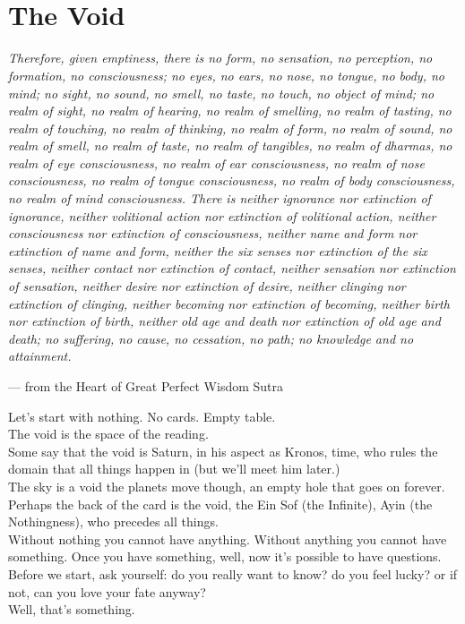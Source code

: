 \documentclass[openright]{book}
\newcommand{\numchapter}[2]{%
  \newpage
  \section*{{\fontsize{14}{17}\selectfont #1}\\[2mm] #2}%
  \addcontentsline{toc}{section}{#1\hspace{1.5mm}#2}%
}
\begin{document}
\pagestyle{content}
\setcounter{page}{1}

\tableofcontents

\numchapter{0}{The Void}

{\fontsize{11}{13}\selectfont\itshape
Therefore, given emptiness, there is no form, no sensation, no perception, no formation, no consciousness; no eyes, no ears, no nose, no tongue, no body, no mind; no sight, no sound, no smell, no taste, no touch, no object of mind; no realm of sight, no realm of hearing, no realm of smelling, no realm of tasting, no realm of touching, no realm of thinking, no realm of form, no realm of sound, no realm of smell, no realm of taste, no realm of tangibles, no realm of dharmas, no realm of eye consciousness, no realm of ear consciousness, no realm of nose consciousness, no realm of tongue consciousness, no realm of body consciousness, no realm of mind consciousness. There is neither ignorance nor extinction of ignorance, neither volitional action nor extinction of volitional action, neither consciousness nor extinction of consciousness, neither name and form nor extinction of name and form, neither the six senses nor extinction of the six senses, neither contact nor extinction of contact, neither sensation nor extinction of sensation, neither desire nor extinction of desire, neither clinging nor extinction of clinging, neither becoming nor extinction of becoming, neither birth nor extinction of birth, neither old age and death nor extinction of old age and death; no suffering, no cause, no cessation, no path; no knowledge and no attainment.

\begin{flushright}
--- from the Heart of Great Perfect Wisdom Sutra
\end{flushright}
}

\newpage

\noindent Let's start with nothing. No cards. Empty table.\\
The void is the space of the reading.\\
Some say that the void is Saturn, in his aspect as Kronos, time, who rules the domain that all things happen in (but we'll meet him later.)\\
The sky is a void the planets move though, an empty hole that goes on forever.\\
Perhaps the back of the card is the void, the Ein Sof (the Infinite), Ayin (the Nothingness), who precedes all things.\\
Without nothing you cannot have anything. Without anything you cannot have something. Once you have something, well, now it's possible to have questions.\\
Before we start, ask yourself: do you really want to know? do you feel lucky? or if not, can you love your fate anyway?\\
Well, that's something.
\end{document}
